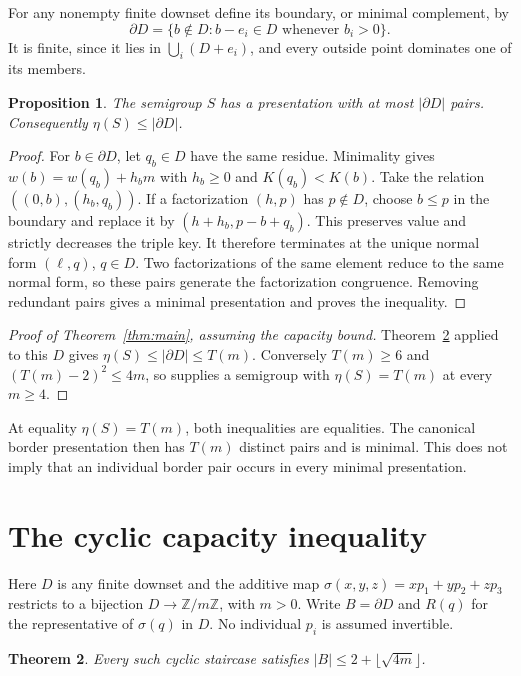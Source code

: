 \documentclass[11pt]{article}
\newtheorem{theorem}{Theorem}[section]
\newtheorem{proposition}[theorem]{Proposition}
\begin{document}
For any nonempty finite downset define its boundary, or minimal complement, by
\[
\partial D=\{b\notin D:b-e_i\in D\text{ whenever }b_i>0\}.
\]
It is finite, since it lies in $\bigcup_i(D+e_i)$, and every outside
point dominates one of its members.

\begin{proposition}\label{prop:border}
The semigroup $S$ has a presentation with at most $|\partial D|$ pairs.
Consequently $\eta(S)\le|\partial D|$.
\end{proposition}
\begin{proof}
For $b\in\partial D$, let $q_b\in D$ have the same residue.
Minimality gives
$w(b)=w(q_b)+h_bm$ with $h_b\ge0$ and $K(q_b)<K(b)$.
Take the relation $((0,b),(h_b,q_b))$.
If a factorization $(h,p)$ has $p\notin D$, choose $b\le p$ in the
boundary and replace it by $(h+h_b,p-b+q_b)$. This preserves value
and strictly decreases the triple key. It therefore terminates at the
unique normal form $(\ell,q)$, $q\in D$. Two factorizations of the same
element reduce to the same normal form, so these pairs generate the
factorization congruence. Removing redundant pairs gives a minimal
presentation and proves the inequality.
\end{proof}

\begin{proof}[Proof of Theorem~\ref{thm:main}, assuming the capacity bound]
Theorem~\ref{thm:capacity} applied to this $D$ gives
$\eta(S)\le|\partial D|\le T(m)$.
Conversely $T(m)\ge6$ and $(T(m)-2)^2\le4m$, so
\cite[Theorem~6.3]{EHOOPK24} supplies a semigroup with
$\eta(S)=T(m)$ at every $m\ge4$.
\end{proof}

At equality $\eta(S)=T(m)$, both inequalities are equalities.
The canonical border presentation then has $T(m)$ distinct pairs
and is minimal. This does not imply that an individual border pair
occurs in every minimal presentation.

\section{The cyclic capacity inequality}\label{sec:capacity}
Here $D$ is any finite downset and the additive map
$\sigma(x,y,z)=xp_1+yp_2+zp_3$ restricts to a bijection
$D\to\mathbb Z/m\mathbb Z$, with $m>0$.
Write $B=\partial D$ and $R(q)$ for the representative of $\sigma(q)$
in $D$. No individual $p_i$ is assumed invertible.

\begin{theorem}\label{thm:capacity}
Every such cyclic staircase satisfies
$|B|\le2+\lfloor\sqrt{4m}\rfloor$.
\end{theorem}
\end{document}
